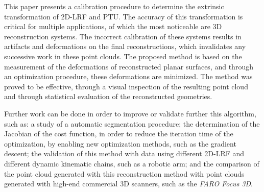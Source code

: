 \documentclass[conference]{IEEEtran}
\begin{document}
This paper presents a calibration procedure to determine the extrinsic transformation of 2D-LRF and PTU. The accuracy of this transformation is critical for multiple applications, of which the most noticeable are 3D reconstruction systems. The incorrect calibration of these systems results in artifacts and deformations on the final reconstructions, which invalidates any successive work in these point clouds. The proposed method is based on the measurement of the deformations of reconstructed planar surfaces, and through an optimization procedure, these deformations are minimized. The method was proved to be effective, through a visual inspection of the resulting point cloud and through statistical evaluation of the reconstructed geometries.

Further work can be done in order to improve or validate further this algorithm, such as: a study of a automatic segmentation procedure; the determination of the Jacobian of the cost function, in order to reduce the iteration time of the optimization, by enabling new optimization methods, such as the gradient descent; the validation of this method with data using different 2D-LRF and different dynamic kinematic chains, such as a robotic arm; and the comparison of the point cloud generated with this reconstruction method with point clouds generated with high-end commercial 3D scanners, such as the \textit{FARO Focus 3D}.




\end{document}
